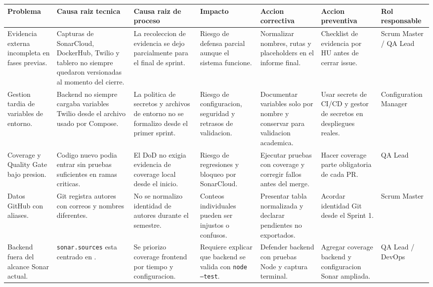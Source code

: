 \documentclass[11pt,a4paper]{article}
\begin{document}
\begin{landscape}
\begin{table}[H]
\centering
\footnotesize
\begin{tabularx}{\linewidth}{P{2.8cm}P{3.3cm}P{3.2cm}P{2.5cm}P{3.4cm}P{3.4cm}P{2.5cm}}
\toprule
\textbf{Problema} & \textbf{Causa raiz tecnica} & \textbf{Causa raiz de proceso} & \textbf{Impacto} & \textbf{Accion correctiva} & \textbf{Accion preventiva} & \textbf{Rol responsable} \\
\midrule
Evidencia externa incompleta en fases previas. & Capturas de SonarCloud, DockerHub, Twilio y tablero no siempre quedaron versionadas al momento del cierre. & La recoleccion de evidencia se dejo parcialmente para el final de sprint. & Riesgo de defensa parcial aunque el sistema funcione. & Normalizar nombres, rutas y placeholders en el informe final. & Checklist de evidencia por HU antes de cerrar issue. & Scrum Master / QA Lead \\
Gestion tardia de variables de entorno. & Backend no siempre cargaba variables Twilio desde el archivo usado por Compose. & La politica de secretos y archivos de entorno no se formalizo desde el primer sprint. & Riesgo de configuracion, seguridad y retrasos de validacion. & Documentar variables solo por nombre y conservar  para validacion academica. & Usar secrets de CI/CD y gestor de secretos en despliegues reales. & Configuration Manager \\
Coverage y Quality Gate bajo presion. & Codigo nuevo podia entrar sin pruebas suficientes en ramas criticas. & El DoD no exigia evidencia de coverage local desde el inicio. & Riesgo de regresiones y bloqueo por SonarCloud. & Ejecutar pruebas con coverage y corregir fallos antes del merge. & Hacer coverage parte obligatoria de cada PR. & QA Lead \\
Datos GitHub con aliases. & Git registra autores con correos y nombres diferentes. & No se normalizo identidad de autores durante el semestre. & Conteos individuales pueden ser injustos o confusos. & Presentar tabla normalizada y declarar pendientes no exportados. & Acordar identidad Git desde el Sprint 1. & Scrum Master \\
Backend fuera del alcance Sonar actual. & \texttt{sonar.sources} esta centrado en . & Se priorizo coverage frontend por tiempo y configuracion. & Requiere explicar que backend se valida con \texttt{node --test}. & Defender backend con pruebas Node y captura terminal. & Agregar coverage backend y configuracion Sonar ampliada. & QA Lead / DevOps \\

\end{tabularx}
\end{table}
\end{landscape}
\end{document}
